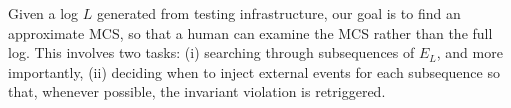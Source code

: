 
Given a log $L$ generated from testing infrastructure,
our goal is to find an approximate MCS, so that a human can examine the MCS
rather than the full log. This involves two tasks:
(i) searching through subsequences of $E_L$, and more importantly, (ii) deciding when to inject external
events for each subsequence so that, whenever possible, the invariant
violation is retriggered.
